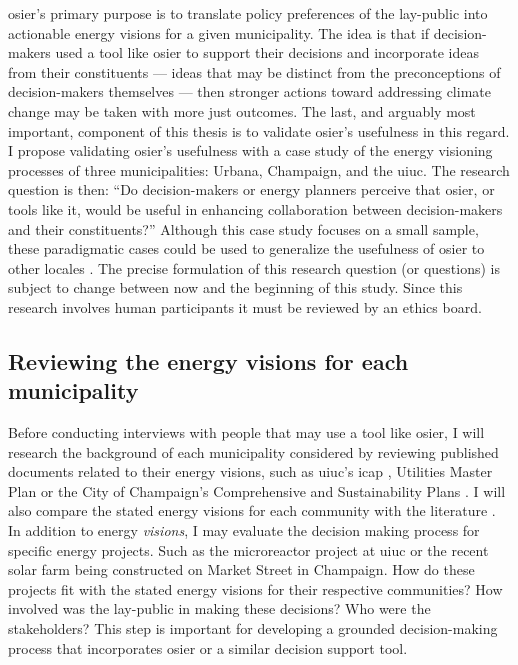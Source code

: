 \ac{osier}'s primary purpose is to translate policy preferences of the
lay-public into actionable energy visions for a given municipality. The idea is
that if decision-makers used a tool like \ac{osier} to support their decisions
and incorporate ideas from their constituents --- ideas that may be distinct
from the preconceptions of decision-makers themselves --- then stronger actions
toward addressing climate change may be taken with more just outcomes. The last,
and arguably most important, component of this thesis is to validate
\ac{osier}'s usefulness in this regard. I propose validating \ac{osier}'s
usefulness with a case study of the energy visioning processes of three
municipalities: Urbana, Champaign, and the \ac{uiuc}. The research question is
then: ``Do decision-makers or energy planners perceive that \ac{osier}, or tools
like it, would be useful in enhancing collaboration between decision-makers and
their constituents?'' Although this case study focuses on a small sample, these
paradigmatic cases could be used to generalize the usefulness of \ac{osier} to
other locales \cite{flyvbjerg_five_2006}. The precise formulation of this
research question (or questions) is subject to change between now and the
beginning of this study. Since this research involves human participants it must
be reviewed by an ethics board.

\subsection{Reviewing the energy visions for each municipality}

Before conducting interviews with people that may use a tool like \ac{osier}, I
will research the background of each municipality considered by reviewing
published documents related to their energy visions, such as \ac{uiuc}'s
\ac{icap}
\cite{institute_for_sustainability_energy_and_environment_illinois_2020},
Utilities Master Plan \cite{affiliated_engineers_inc_utilities_2015} or the City
of Champaign's Comprehensive and Sustainability Plans
\cite{knight_champaign_2013,knight_champaign_2021}. I will also compare the
stated energy visions for each community with the literature
\cite{elmallah_frontlining_2022}. In addition to energy \textit{visions}, I may
evaluate the decision making process for specific energy projects. Such as the
microreactor project at \ac{uiuc} or the recent solar farm being constructed on
Market Street in Champaign. How do these projects fit with the stated energy
visions for their respective communities? How involved was the lay-public in
making these decisions? Who were the stakeholders? This step is important for
developing a grounded decision-making process that incorporates \ac{osier} or a
similar decision support tool. 

